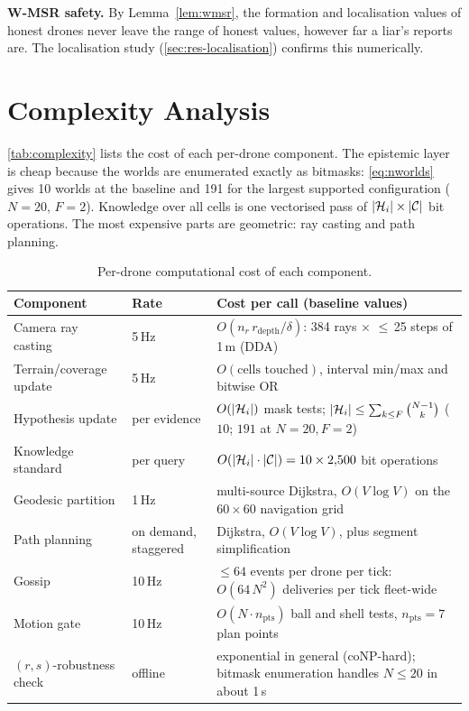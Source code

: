 \textbf{W-MSR safety.} By Lemma~\ref{lem:wmsr}, the formation and localisation values of honest drones never leave the range
of honest values, however far a liar's reports are. The localisation study (\autoref{sec:res-localisation}) confirms this
numerically.

\section{Complexity Analysis}
\label{sec:complexity}

\autoref{tab:complexity} lists the cost of each per-drone component. The epistemic layer is cheap because the worlds are
enumerated exactly as bitmasks: \eqref{eq:nworlds} gives 10 worlds at the baseline and 191 for the largest supported
configuration ($N=20$, $F=2$). Knowledge over all cells is one vectorised pass of $|\mathcal{H}_i|\times|\mathcal{C}|$
bit operations. The most expensive parts are geometric: ray casting and path planning.

\begin{table}[h]
\centering
\renewcommand{\arraystretch}{1.25}
\begin{tabularx}{\linewidth}{@{}l l X@{}}
\toprule
\textbf{Component} & \textbf{Rate} & \textbf{Cost per call (baseline values)} \\
\midrule
Camera ray casting & 5\,Hz & $O(n_r\,r_{\mathrm{depth}}/\delta)$: 384 rays $\times$ $\le$\,25 steps of 1\,m (DDA) \\
Terrain/coverage update & 5\,Hz & $O(\text{cells touched})$, interval min/max and bitwise OR \\
Hypothesis update & per evidence & $O(|\mathcal{H}_i|)$ mask tests; $|\mathcal{H}_i|\le\sum_{k\le F}\binom{N-1}{k}$ ($10$; $191$ at $N{=}20,F{=}2$) \\
Knowledge standard & per query & $O(|\mathcal{H}_i|\cdot|\mathcal{C}|)=10\times2{,}500$ bit operations \\
Geodesic partition & 1\,Hz & multi-source Dijkstra, $O(V\log V)$ on the $60\times60$ navigation grid \\
Path planning & on demand, staggered & Dijkstra, $O(V\log V)$, plus segment simplification \\
Gossip & 10\,Hz & $\le 64$ events per drone per tick: $O(64\,N^2)$ deliveries per tick fleet-wide \\
Motion gate & 10\,Hz & $O(N\cdot n_{\mathrm{pts}})$ ball and shell tests, $n_{\mathrm{pts}}=7$ plan points \\
$(r,s)$-robustness check & offline & exponential in general (coNP-hard); bitmask enumeration handles $N\le20$ in about 1\,s \\
\bottomrule
\end{tabularx}
\caption{Per-drone computational cost of each component.}
\label{tab:complexity}
\end{table}

